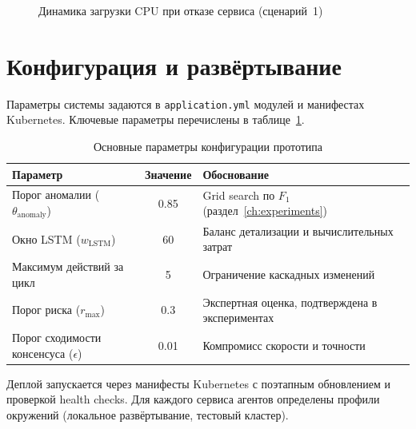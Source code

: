 \begin{figure}[H]
\centering
{}
\caption{Динамика загрузки CPU при отказе сервиса (сценарий~1)}
\label{fig:recovery_scenario}
\end{figure}

\section{Конфигурация и развёртывание}

Параметры системы задаются в \texttt{application.yml} модулей и манифестах Kubernetes. Ключевые параметры перечислены в таблице~\ref{tab:prototype_params}.

\begin{table}[H]
\centering
\caption{Основные параметры конфигурации прототипа}
\label{tab:prototype_params}
\begin{tabular}{|p{5cm}|c|p{5cm}|}
\hline
\textbf{Параметр} & \textbf{Значение} & \textbf{Обоснование} \\
\hline
Порог аномалии ($\theta_{\text{anomaly}}$) & 0.85 & Grid search по $F_1$ (раздел~\ref{ch:experiments}) \\
\hline
Окно LSTM ($w_{\text{LSTM}}$) & 60 & Баланс детализации и вычислительных затрат \\
\hline
Максимум действий за цикл & 5 & Ограничение каскадных изменений \\
\hline
Порог риска ($r_{\max}$) & 0.3 & Экспертная оценка, подтверждена в экспериментах \\
\hline
Порог сходимости консенсуса ($\epsilon$) & 0.01 & Компромисс скорости и точности \\
\hline
\end{tabular}
\end{table}

Деплой запускается через манифесты Kubernetes с поэтапным обновлением и проверкой health checks. Для каждого сервиса агентов определены профили окружений (локальное развёртывание, тестовый кластер).

